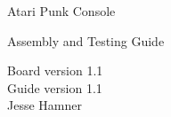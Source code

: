 \documentclass[12pt]{article}
\newcommand{\+}{\item}		%
\newcommand{\revision}{1.1}
\newif\ifkey
\begin{document}
\thispagestyle{empty}
\begin{center}
\begin{Huge}
Atari Punk Console\\
\end{Huge}
\bigskip
\begin{Large}
\ifkey
Assembly, Testing, and Designer's Guide\\
\else
Assembly and Testing Guide\\
\fi

\end{Large}
\bigskip
Board version \revision\\
Guide version 1.1\\
Jesse Hamner\\
\vspace{0.2in}


\end{center}

\tableofcontents

\vfill 
\end{document}
